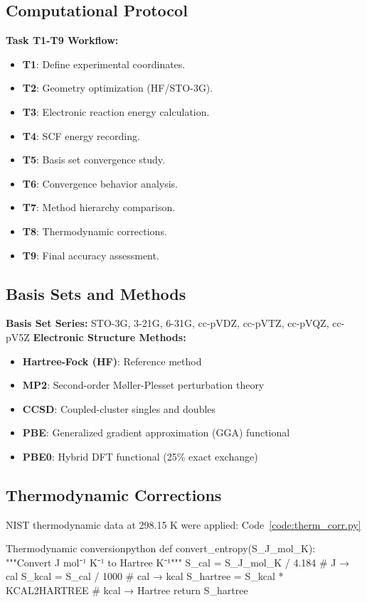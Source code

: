 \documentclass{template}
\begin{document}
\subsection{Computational Protocol}
\textbf{Task T1-T9 Workflow:}
\begin{itemize}
\item \textbf{T1}: Define experimental coordinates.
\item \textbf{T2}: Geometry optimization (HF/STO-3G).
\item \textbf{T3}: Electronic reaction energy calculation.
\item \textbf{T4}: SCF energy recording.
\item \textbf{T5}: Basis set convergence study.
\item \textbf{T6}: Convergence behavior analysis.
\item \textbf{T7}: Method hierarchy comparison.
\item \textbf{T8}: Thermodynamic corrections.
\item \textbf{T9}: Final accuracy assessment.
\end{itemize}

\subsection{Basis Sets and Methods}
\textbf{Basis Set Series:} STO-3G, 3-21G, 6-31G, cc-pVDZ, cc-pVTZ, cc-pVQZ, cc-pV5Z
\textbf{Electronic Structure Methods:}
\begin{itemize}
\item \textbf{Hartree-Fock (HF)}: Reference method
\item \textbf{MP2}: Second-order Møller-Plesset perturbation theory
\item \textbf{CCSD}: Coupled-cluster singles and doubles
\item \textbf{PBE}: Generalized gradient approximation (GGA) functional
\item \textbf{PBE0}: Hybrid DFT functional (25\% exact exchange)
\end{itemize}

\subsection{Thermodynamic Corrections}
NIST thermodynamic data at 298.15 K were applied: Code~\ref{code:therm_corr.py}
\begin{codebox}{Thermodynamic conversion}{python}
def convert_entropy(S_J_mol_K):
    """Convert J mol⁻¹ K⁻¹ to Hartree K⁻¹"""
    S_cal = S_J_mol_K / 4.184        # J → cal
    S_kcal = S_cal / 1000            # cal → kcal
    S_hartree = S_kcal * KCAL2HARTREE  # kcal → Hartree
    return S_hartree
\end{codebox}
\end{document}
